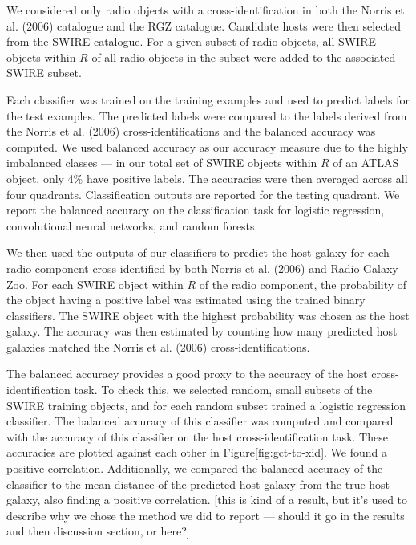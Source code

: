 \documentclass[fleqn,usenatbib,usedcolumn]{mnras}
\begin{document}
    We considered only radio objects with a cross-identification in both the
    Norris et al. (2006) catalogue and the RGZ catalogue. Candidate hosts
    were then selected from the SWIRE catalogue. For a given subset of radio
    objects, all SWIRE objects within \(R\) of all radio objects in the
    subset were added to the associated SWIRE subset.

    Each classifier was trained on the training examples and used to predict
    labels for the test examples. The predicted labels were compared to the
    labels derived from the Norris et al. (2006) cross-identifications and
    the balanced accuracy was computed. We used balanced accuracy as our
    accuracy measure due to the highly imbalanced classes --- in our total
    set of SWIRE objects within \(R\) of an ATLAS object, only 4\% have
    positive labels. The accuracies were then averaged across all four
    quadrants. Classification outputs are reported for the testing quadrant.
    We report the balanced accuracy on the classification task for logistic
    regression, convolutional neural networks, and random forests.

    We then used the outputs of our classifiers to predict the host galaxy
    for each radio component cross-identified by both Norris et al. (2006)
    and Radio Galaxy Zoo. For each SWIRE object within \(R\) of the radio
    component, the probability of the object having a positive label was
    estimated using the trained binary classifiers. The SWIRE object with
    the highest probability was chosen as the host galaxy. The accuracy was
    then estimated by counting how many predicted host galaxies matched the
    Norris et al. (2006) cross-identifications.

    The balanced accuracy provides a good proxy to the accuracy of the host
    cross-identification task. To check this, we selected random, small
    subsets of the SWIRE training objects, and for each random subset
    trained a logistic regression classifier. The balanced accuracy of this
    classifier was computed and compared with the accuracy of this
    classifier on the host cross-identification task. These accuracies are
    plotted against each other in {Figure}\ref{fig:gct-to-xid}. We
    found a positive correlation. Additionally, we compared the balanced
    accuracy of the classifier to the mean distance of the predicted host
    galaxy from the true host galaxy, also finding a positive correlation.
    {[}this is kind of a result, but it's used to describe why we chose the
    method we did to report --- should it go in the results and then
    discussion section, or here?{]}
\end{document}
